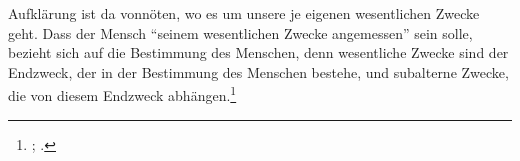 Aufklärung ist da vonnöten, wo es um unsere je eigenen wesentlichen Zwecke geht.
Dass der Mensch \enquote{seinem wesentlichen Zwecke angemessen} sein solle,
bezieht sich auf die Bestimmung des Menschen, denn wesentliche Zwecke sind der
Endzweck, der in der Bestimmung des Menschen bestehe, und subalterne Zwecke,
die von diesem Endzweck abhängen.\footnote{\cite[Vgl.][B
868]{Kant:KritikderreinenVernunft2003}; \cite[][III:
543.7--12]{Kant:GesammelteWerke1900ff.}.}

\begin{comment}
Die Regeln der Geschicklichkeit verhalten sich neutral gegenüber den
wesentlichen Zwecken. Sie brauchen uns nur zu interessieren, wenn wir
entsprechende Zwecke verfolgen. Verfolgen wir die Zwecke nicht, dann sind wir
frei, uns des Urteils zu enthalten; wir urteilen dann weder unverantwortlich
noch fremdbestimmt, weil wir gar nicht urteilen.
Die Ratschläge der Klugheit und die Gebote der Sittlichkeit artikulieren
hingegen notwendige und vernünftige Zwecke des Handelns, die uns ebenso
angehen, wie die Mittel, mit deren Hilfe wir sie erreichen können.
Klugheit als freie Sorge um das je eigene Wohlergehen ist in der Tat ein
wichtiger Aspekt von Mündigkeit. Aber dieser Aspekt steht nicht alleine da,
sondern ist integriert in die Sorge um das moralisch Richtige. Und wenn
Vertreter der Aufklärung von Nützlichkeit sprechen, dann ist damit nicht bloß
gemeint, dass etwas für kontingente Zwecke oder Befriedigung je eigener
zufälliger Begierden brauchbar ist. Gerade die
notwendigen -- etwa moralisch zwingenden -- Ziele des Handelns \emph{respective}
ihre Erkenntnis gelten dem 18. Jahrhundert als \enquote{nützlich}. Da es im Falle der technischen
Regeln der Geschicklichkeit zufällig ist, ob wir ihrer bedürfen, und wir somit
auf diese verzichten können, lasse ich sie außen vor und konzentriere mich auf
Moral und Klugheit.

\end{comment}

